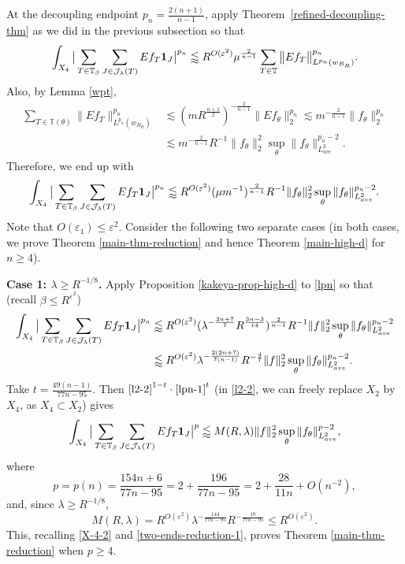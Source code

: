 \documentclass{amsart}
\numberwithin{equation}{section}
\newcommand{\be}{\beta}
\newcommand{\e}{\varepsilon}
\newcommand{\la}{\lambda}
\newcommand{\cj}{\mathcal J}
\newcommand{\ZT}{\mathbb{T}}
\newcommand{\Id}{{\bf 1}}
\begin{document}
At the decoupling endpoint $p_n=\frac{2(n+1)}{n-1}$, apply Theorem~\ref{refined-decoupling-thm} as we did in the previous subsection so that
\begin{equation}
\label{decoupling-2}
    \int_{X_4}\big|\sum_{T\in\ZT_\be}\sum_{J\in\cj_\la(T)}Ef_{T}\Id_J\big|^{p_n}\lessapprox R^{O(\e^2)}\mu^{\frac{2}{n-1}}\sum_{T\in\ZT}\big\|Ef_T\big\|_{L^{p_n}(w_{B_R})}^{p_n}.
\end{equation}
Also, by Lemma \ref{wpt},
\begin{align}
\label{uncertainty-principle-2}
    \sum_{T\in\ZT(\theta)}\big\|Ef_T\big\|_{L^{p_n}(w_{B_R})}^{p_n}&\lesssim (m R^{\frac{n+1}{2}})^{-\frac{2}{n-1}}\|Ef_\theta\|_2^{p_n}\lesssim m^{-\frac{2}{n-1}} \|f_\theta\|_2^{p_n}\\
    &\lesssim m^{-\frac{2}{n-1}}R^{-1}\|f_\theta\|_2^2\sup_\theta\|f_\theta\|_{L^2_{ave}}^{p_n-2}.
\end{align}
Therefore, we end up with
\begin{equation}
\label{lpn}
    \int_{X_4}\big|\sum_{T\in\ZT_\be}\sum_{J\in\cj_\la(T)}Ef_{T}\Id_J\big|^{p_n}\lessapprox R^{O(\e^2)}(\mu m^{-1})^\frac{2}{n-1}R^{-1}\|f_\theta\|_2^2\sup_\theta\|f_\theta\|_{L^2_{ave}}^{p_n-2}.
\end{equation}
Note that $O(\e_1)\leq \e^2$. Consider the following two separate cases (in both cases,  we prove Theorem \ref{main-thm-reduction} and hence Theorem \ref{main-high-d} for $n\geq4$).

\smallskip

{\bf Case 1: $\la\geq R^{-1/8}$.}  
Apply Proposition \ref{kakeya-prop-high-d} to \eqref{lpn} so that (recall $\be\leq R^{\e^2}$)
\begin{align}
\label{lpn-1}
    \int_{X_4}\big|\sum_{T\in\ZT_\be}\sum_{J\in\cj_\la(T)}Ef_{T}\Id_J\big|^{p_n}&\lessapprox R^{O(\e^2)}(\la^{-\frac{2n+7}{7}}R^{\frac{3n-3}{14}})^\frac{2}{n-1}R^{-1}\|f\|_2^2\sup_\theta\|f_\theta\|_{L^2_{ave}}^{p_n-2}\\
    &\lessapprox R^{O(\e^2)}\la^{-\frac{2(2n+7)}{7(n-1)}}R^{-\frac{4}{7}}\|f\|_2^2\sup_\theta\|f_\theta\|_{L^2_{ave}}^{p_n-2}.
\end{align}
Take $t=\frac{49(n-1)}{77n-95}$. Then $\eqref{l2-2}^{1-t}\cdot \eqref{lpn-1}^{t}$ (in \eqref{l2-2}, we can freely replace $X_2$ by $X_4$, as $X_4\subset X_2$) gives
\begin{equation}
    \int_{X_4}\big|\sum_{T\in\ZT_\be}\sum_{J\in\cj_\la(T)}Ef_{T}\Id_J\big|^{p}\lessapprox M(R,\la)\|f\|_2^2\sup_\theta\|f_\theta\|_{L^2_{ave}}^{p-2},
\end{equation}
where 
\begin{equation}
\label{p-n}
    p=p(n)=\frac{154n+6}{77n-95}=2+\frac{196}{77n-95}=2+\frac{28}{11n}+O(n^{-2}),
 \end{equation}
and, since $\la\geq R^{-1/8}$,
\begin{equation}
    M(R,\la)= R^{O(\e^2)}\la^{-\frac{144}{77n-95}}R^{-\frac{18}{77n-95}}\leq R^{O(\e^2)}.
\end{equation}
This, recalling \eqref{X-4-2} and \eqref{two-ends-reduction-1}, proves Theorem \ref{main-thm-reduction} when $p\geq4$.
\end{document}
